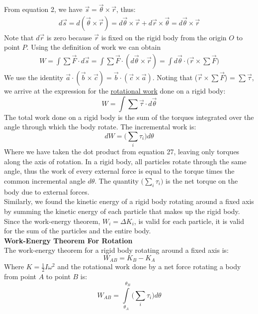 \documentclass[a4paper]{article}
\let\bf\textbf
\begin{document}
From equation 2, we have $\vec{s} = \vec{\theta}\times\vec{r}$, thus:
\begin{align*}
    d\vec{s} = d(\vec{\theta}\times\vec{r}) = d\vec{\theta}\times\vec{r} + d\vec{r}\times\vec{\theta} = d\vec{\theta}\times\vec{r}
\end{align*}
Note that $d\vec{r}$ is zero because $\vec{r}$ is fixed on the rigid body from the origin $O$ to point $P$. Using the definition of work we can obtain
\begin{align*}
    W = \int\sum\vec{F}\cdot d\vec{s} = \int\sum\vec{F}\cdot(d\vec{\theta}\times\vec{r}) = \int d\vec{\theta}\cdot\Big(\vec{r}\times\sum\vec{F}\Big)
\end{align*}
We use the identity $\vec{a}\cdot(\vec{b}\times\vec{c}) = \vec{b}\cdot(\vec{c}\times\vec{a})$. Noting that ($\vec{r}\times\sum\vec{F}$) = $\sum\vec{\tau}$, we arrive at the expression for the \underline{rotational work} done on a rigid body:
\begin{equation}
    W = \int\sum\vec{\tau}\cdot d\vec{\theta}
\end{equation}
The total work done on a rigid body is the sum of the torques integrated over the angle through which the body rotate. The incremental work is:
\begin{equation}
    dW = \bigg(\sum_{i}\tau_i\bigg)d\theta
\end{equation}
Where we have taken the dot product from equation 27, leaving only torques along the axis of rotation. In a rigid body, all particles rotate through the same angle, thus the work of every external force is equal to the torque times the common incremental angle $d\theta$. The quantity $\Big(\sum\limits_i\tau_i\Big)$ is the net torque on the body due to external forces.\\
Similarly, we found the kinetic energy of a rigid body rotating around a fixed axis by summing the kinetic energy of each particle that makes up the rigid body. Since the work-energy theorem, $W_i = \Delta K_i$, is valid for each particle, it is valid for the sum of the particles and the entire body.
\vspace{2mm}\\
\bf{Work-Energy Theorem For Rotation}
\vspace{1mm}\\
The work-energy theorem for a rigid body rotating around a fixed axis is:
\begin{equation}
    W_{AB} = K_B - K_A
\end{equation}
Where $K = \frac{1}{2}I\omega^2$ and the rotational work done by a net force rotating a body from point $A$ to point $B$ is:
\begin{equation}
    W_{AB} = \int\limits_{\theta_A}^{\text{ }\theta_B}\bigg(\sum_{i}\tau_i\bigg)d\theta
\end{equation}
\end{document}
